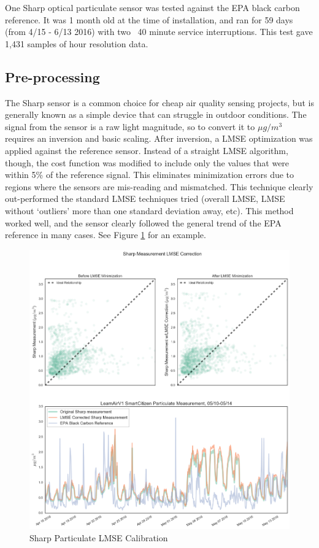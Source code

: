 One Sharp optical particulate sensor was tested against the EPA black carbon reference.  It was 1 month old at the time of installation, and ran for 59 days (from 4/15 - 6/13 2016) with two ~40 minute service interruptions.  This test gave 1,431 samples of hour resolution data.


\subsection{Pre-processing}

The Sharp sensor is a common choice for cheap air quality sensing projects, but is generally known as a simple device that can struggle in outdoor conditions.  The signal from the sensor is a raw light magnitude, so to convert it to $\mu g/m^3$ requires an inversion and basic scaling.  After inversion, a LMSE optimization was applied against the reference sensor.  Instead of a straight LMSE algorithm, though, the cost function was modified to include only the values that were within 5\% of the reference signal.  This eliminates minimization errors due to regions where the sensors are mis-reading and mismatched.  This technique clearly out-performed the standard LMSE techniques tried (overall LMSE, LMSE without `outliers' more than one standard deviation away, etc).    This method worked well, and the sensor clearly followed the general trend of the EPA reference in many cases.  See Figure \ref{fig:sharpDust_lmse} for an example.

\begin{figure}[htb]
 	\includegraphics[width=\textwidth]{figs/sharpDust_lmse}               
 	 \caption{Sharp Particulate LMSE Calibration}
  	\label{fig:sharpDust_lmse}
\end{figure}

